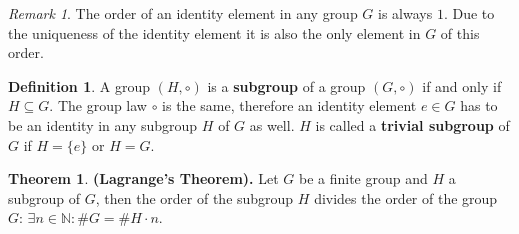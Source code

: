 \documentclass[thesis=M,english]{FITthesis}[2012/10/20]
\theoremstyle{remark}
\newtheorem*{RM}{Remark}
\newtheorem*{NRM}{Notational Remark}
\theoremstyle{definition}
\newtheorem{DF}{Definition}[section]
\newtheorem{theorem}{Theorem}[section]
\begin{document}
\begin{RM}
The order of an identity element in any group $G$ is always $1$. Due to the uniqueness of the identity element it is also the only element in $G$ of this order.
\end{RM}
\begin{DF}
A group $(H, \circ)$ is a \textbf{subgroup} of a group $(G, \circ)$ if and only if $H \subseteq G.$ The group law $\circ$ is the same, therefore an identity element $e \in G$ has to be an identity in any subgroup $H$ of $G$ as well. $H$ is called a \textbf{trivial subgroup} of $G$ if $H = \{e\}$ or $H = G$.
\end{DF}
\begin{theorem}
\textbf{(Lagrange's Theorem).} Let $G$ be a finite group and $H$ a subgroup of $G$, then the order of the subgroup $H$ divides the order of the group $G$: $\exists n \in \mathbb{N}: \#G = \#H \cdot n.$
\label{lagrange}
\end{theorem}
\end{document}
